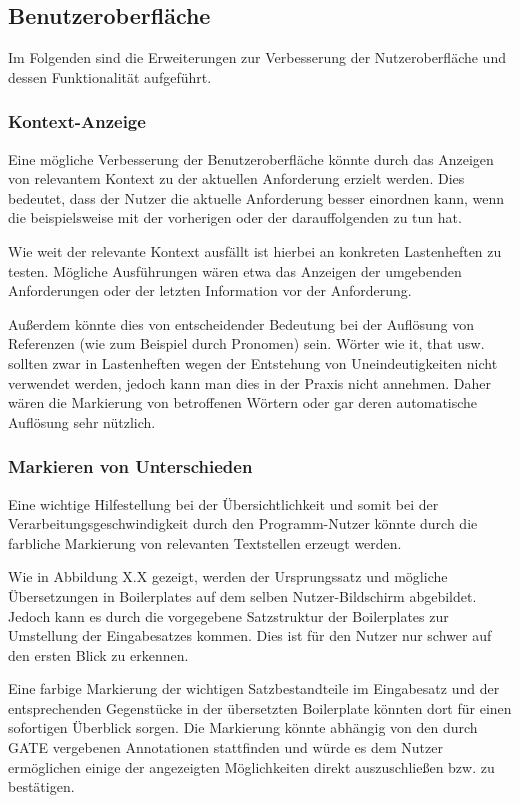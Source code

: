 \documentclass[12pt]{report}
\begin{document}
\subsection{Benutzeroberfläche}
Im Folgenden sind die Erweiterungen zur Verbesserung der Nutzeroberfläche und dessen Funktionalität aufgeführt. 

\subsubsection{Kontext-Anzeige}
Eine mögliche Verbesserung der Benutzeroberfläche könnte durch das Anzeigen von relevantem Kontext zu der aktuellen Anforderung erzielt werden. Dies bedeutet, dass der Nutzer die aktuelle Anforderung besser einordnen kann, wenn die beispielsweise mit der vorherigen oder der darauffolgenden zu tun hat. 

Wie weit der relevante Kontext ausfällt ist hierbei an konkreten Lastenheften zu testen. Mögliche Ausführungen wären etwa das Anzeigen der umgebenden Anforderungen oder der letzten Information vor der Anforderung.  

Außerdem könnte dies von entscheidender Bedeutung bei der Auflösung von Referenzen (wie zum Beispiel durch Pronomen) sein. Wörter wie \glqq it\grqq{}, \glqq that\grqq{} usw. sollten zwar in Lastenheften wegen der Entstehung von Uneindeutigkeiten nicht verwendet werden, jedoch kann man dies in der Praxis nicht annehmen. Daher wären die Markierung von betroffenen Wörtern oder gar deren automatische Auflösung sehr nützlich.

\subsubsection{Markieren von Unterschieden}
Eine wichtige Hilfestellung bei der Übersichtlichkeit und somit bei der Verarbeitungsgeschwindigkeit durch den Programm-Nutzer könnte durch die farbliche Markierung von relevanten Textstellen erzeugt werden.
 
Wie in Abbildung X.X gezeigt, werden der Ursprungssatz und mögliche Übersetzungen in Boilerplates auf dem selben Nutzer-Bildschirm abgebildet. Jedoch kann es durch die vorgegebene Satzstruktur der Boilerplates zur Umstellung der Eingabesatzes kommen. Dies ist für den Nutzer nur schwer auf den ersten Blick zu erkennen.

Eine farbige Markierung der wichtigen Satzbestandteile im Eingabesatz und der entsprechenden Gegenstücke in der übersetzten Boilerplate könnten dort für einen sofortigen Überblick sorgen. Die Markierung könnte abhängig von den durch GATE vergebenen Annotationen stattfinden und würde es dem Nutzer ermöglichen einige der angezeigten Möglichkeiten direkt auszuschließen bzw. zu bestätigen.
\end{document}
